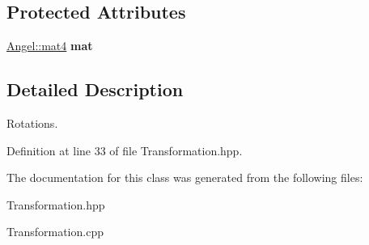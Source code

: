 \subsection*{Protected Attributes}
\begin{DoxyCompactItemize}
\item 
\hypertarget{class_transformation_a5f39fb578a1cdf78ca85efbd932d3834}{\hyperlink{class_angel_1_1mat4}{Angel\-::mat4} {\bfseries mat}}\label{class_transformation_a5f39fb578a1cdf78ca85efbd932d3834}

\end{DoxyCompactItemize}


\subsection{Detailed Description}
Rotations. 

Definition at line 33 of file Transformation.\-hpp.



The documentation for this class was generated from the following files\-:\begin{DoxyCompactItemize}
\item 
Transformation.\-hpp\item 
Transformation.\-cpp\end{DoxyCompactItemize}
